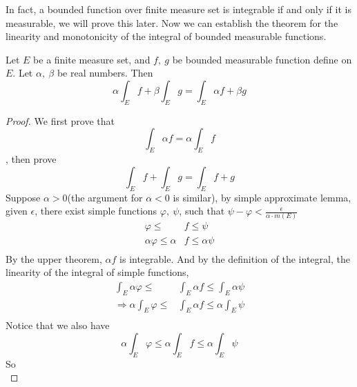 \documentclass[lang=en, 12pt]{elegantbook}
\begin{document}
            In fact, a bounded function over finite measure set is integrable if and only if it is measurable, we will prove this later.
        Now we can establish the theorem for the linearity and monotonicity of the integral of bounded measurable functions.
            \begin{theorem}[Linearity]
                Let $E$ be a finite measure set, and $f, \ g$ be bounded measurable function define on $E$. Let $\alpha, \ \beta$ be
            real numbers. Then
                \begin{equation}
                    \alpha \int_E f + \beta \int_E g = \int_E \alpha f + \beta g
                \end{equation}
            \end{theorem}
            \begin{proof}
                We first prove that $$\int_E \alpha f = \alpha \int_E f$$, then prove $$\int_E f + \int_E g = \int_E f+g $$
            Suppose $\alpha>0$(the argument for $\alpha <0$ is similar), by simple approximate lemma, given $\epsilon$, there exist simple
            functions $\varphi, \ \psi$, such that $\psi - \varphi < \frac{\epsilon}{\alpha \cdot m(E)}$
                \begin{equation*}
                    \begin{aligned}
                        \varphi \leq &f \leq \psi \\
                        \alpha \varphi \leq \alpha&f \leq \alpha\psi \\
                    \end{aligned}
                \end{equation*}
            By the upper theorem, $\alpha f$ is integrable. And by the definition of the integral, the linearity of the integral of simple functions,
            \begin{equation*}
                \begin{aligned}
                    \int_E \alpha \varphi \leq &\int_E \alpha f \leq \int_E \alpha \psi\\
                    \Rightarrow \alpha \int_E \varphi \leq &\int_E \alpha f \leq \alpha \int_E \psi\\ 
                \end{aligned}
            \end{equation*}
            Notice that we also have 
            $$\alpha \int_E \varphi \leq \alpha \int_E f \leq \alpha \int_E \psi$$
            So 
            \begin{equation*}

\end{equation*}
\end{proof}
\end{document}
